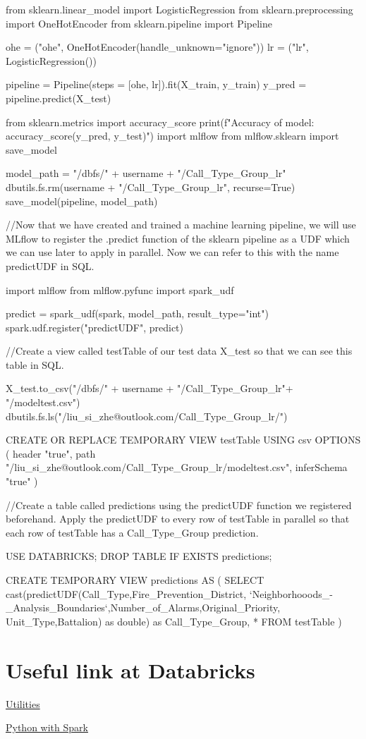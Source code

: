 \documentclass[12pt]{article}
\begin{document}
\begin{code}
from sklearn.linear_model import LogisticRegression
from sklearn.preprocessing import OneHotEncoder
from sklearn.pipeline import Pipeline


ohe = ("ohe", OneHotEncoder(handle_unknown="ignore"))
lr = ("lr", LogisticRegression())

pipeline = Pipeline(steps = [ohe, lr]).fit(X_train, y_train)
y_pred = pipeline.predict(X_test)

from sklearn.metrics import accuracy_score
print(f"Accuracy of model: {accuracy_score(y_pred, y_test)}")
import mlflow
from mlflow.sklearn import save_model

model_path = "/dbfs/" + username + "/Call_Type_Group_lr"
dbutils.fs.rm(username + "/Call_Type_Group_lr", recurse=True)
save_model(pipeline, model_path)

//Now that we have created and trained a machine learning pipeline, we will use MLflow to register the .predict function of the sklearn pipeline as a UDF which we can use later to apply in parallel. Now we can refer to this with the name predictUDF in SQL.

import mlflow
from mlflow.pyfunc import spark_udf

predict = spark_udf(spark, model_path, result_type="int")
spark.udf.register("predictUDF", predict)

//Create a view called testTable of our test data X_test so that we can see this table in SQL.

X_test.to_csv("/dbfs/" + username + "/Call_Type_Group_lr"+ "/modeltest.csv")
dbutils.fs.ls("/liu_si_zhe@outlook.com/Call_Type_Group_lr/")

CREATE OR REPLACE TEMPORARY VIEW testTable
USING csv
OPTIONS (
  header "true",
  path "/liu_si_zhe@outlook.com/Call_Type_Group_lr/modeltest.csv",
  inferSchema "true"
)

//Create a table called predictions using the predictUDF function we registered beforehand. Apply the predictUDF to every row of testTable in parallel so that each row of testTable has a Call_Type_Group prediction.

USE DATABRICKS;
DROP TABLE IF EXISTS predictions;

CREATE TEMPORARY VIEW predictions AS (
  SELECT cast(predictUDF(Call_Type,Fire_Prevention_District, `Neighborhooods_-_Analysis_Boundaries`,Number_of_Alarms,Original_Priority,
  Unit_Type,Battalion) as double) as Call_Type_Group, *
  FROM testTable
)
\end{code}
   
\section{Useful link at Databricks}
\hyperlink{https://docs.azuredatabricks.net/dev-tools/databricks-utils.html}{Utilities}

\hyperlink{https://kb.azuredatabricks.net/python/index.html}{Python with Spark}
\end{document}
